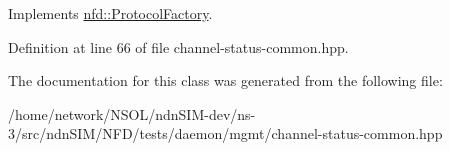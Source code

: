 Implements \hyperlink{classnfd_1_1ProtocolFactory_ae7399319c46091b401a3de37d0a5b693}{nfd\+::\+Protocol\+Factory}.



Definition at line 66 of file channel-\/status-\/common.\+hpp.



The documentation for this class was generated from the following file\+:\begin{DoxyCompactItemize}
\item 
/home/network/\+N\+S\+O\+L/ndn\+S\+I\+M-\/dev/ns-\/3/src/ndn\+S\+I\+M/\+N\+F\+D/tests/daemon/mgmt/channel-\/status-\/common.\+hpp\end{DoxyCompactItemize}
